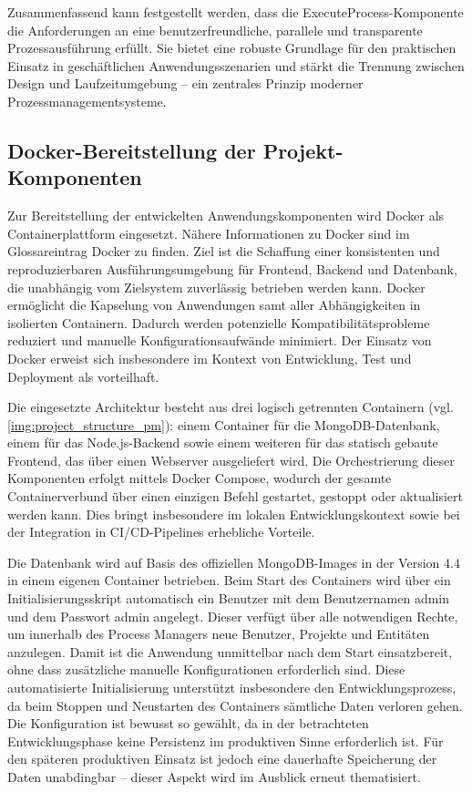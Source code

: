 Zusammenfassend kann festgestellt werden, dass die ExecuteProcess-Komponente die Anforderungen an eine benutzerfreundliche, parallele und transparente Prozessausführung erfüllt. Sie bietet eine robuste Grundlage für den praktischen Einsatz in geschäftlichen Anwendungsszenarien und stärkt die Trennung zwischen Design und Laufzeitumgebung – ein zentrales Prinzip moderner Prozessmanagementsysteme.



\newpage
\subsection{Docker-Bereitstellung der Projekt-Komponenten} \label{docker}
Zur Bereitstellung der entwickelten Anwendungskomponenten wird Docker als Containerplattform eingesetzt. Nähere Informationen zu Docker sind im Glossareintrag \gls{Docker} zu finden. Ziel ist die Schaffung einer konsistenten und reproduzierbaren Ausführungsumgebung für Frontend, Backend und Datenbank, die unabhängig vom Zielsystem zuverlässig betrieben werden kann. Docker ermöglicht die Kapselung von Anwendungen samt aller Abhängigkeiten in isolierten Containern. Dadurch werden potenzielle Kompatibilitätsprobleme reduziert und manuelle Konfigurationsaufwände minimiert. Der Einsatz von Docker erweist sich insbesondere im Kontext von Entwicklung, Test und Deployment als vorteilhaft.

Die eingesetzte Architektur besteht aus drei logisch getrennten Containern (vgl. \autoref{img:project_structure_pm}): einem Container für die MongoDB-Datenbank, einem für das Node.js-Backend sowie einem weiteren für das statisch gebaute Frontend, das über einen Webserver ausgeliefert wird. Die Orchestrierung dieser Komponenten erfolgt mittels Docker Compose, wodurch der gesamte Containerverbund über einen einzigen Befehl gestartet, gestoppt oder aktualisiert werden kann. Dies bringt insbesondere im lokalen Entwicklungskontext sowie bei der Integration in CI/CD-Pipelines erhebliche Vorteile.

Die Datenbank wird auf Basis des offiziellen MongoDB-Images in der Version 4.4 in einem eigenen Container betrieben. Beim Start des Containers wird über ein Initialisierungsskript automatisch ein Benutzer mit dem Benutzernamen admin und dem Passwort admin angelegt. Dieser verfügt über alle notwendigen Rechte, um innerhalb des Process Managers neue Benutzer, Projekte und Entitäten anzulegen. Damit ist die Anwendung unmittelbar nach dem Start einsatzbereit, ohne dass zusätzliche manuelle Konfigurationen erforderlich sind. Diese automatisierte Initialisierung unterstützt insbesondere den Entwicklungsprozess, da beim Stoppen und Neustarten des Containers sämtliche Daten verloren gehen. Die Konfiguration ist bewusst so gewählt, da in der betrachteten Entwicklungsphase keine Persistenz im produktiven Sinne erforderlich ist. Für den späteren produktiven Einsatz ist jedoch eine dauerhafte Speicherung der Daten unabdingbar – dieser Aspekt wird im Ausblick erneut thematisiert.

